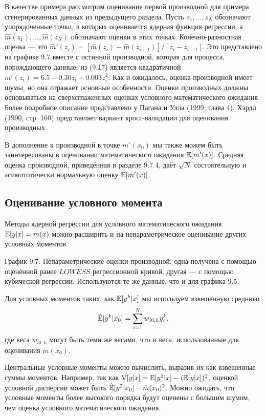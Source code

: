 В качестве примера рассмотрим оценивание первой производной для примера сгенерированных данных из предыдущего раздела. Пусть $z_1, \dots, z_N$ обозначают упорядоченные точки, в которых оценивается ядерная функция регрессии, а $\hat{m}(z_1), \dots, \hat{m}(z_N)$ обозначают оценки в этих точках. Конечно-разностная оценка --- это $\hat{m}'(z_i) = [\hat{m}(z_i) - \hat{m}(z_{i-1})]/[z_i - z_{i-1}]$. Это представлено на графике 9.7 вместе с истинной производной, которая для процесса, порождающего данные,  из (9.17) является квадратичной $m'(z_i) = 6.5 - 0.30z_i + 0.003z_i^2$. Как и ожидалось, оценка производной имеет шумы, но она отражает основные особенности. Оценки производных должны основываться на сверхсглаженных оценках условного математического ожидания. Более подробное описание представлено у Пагана и Улла (1999, глава 4). Хэрдл (1990, стр. 160) представляет вариант кросс-валидации для оценивания производных.

В дополнение к производной в точке $m'(x_0)$ мы также можем быть заинтересованы в оценивании математического ожидания $\mathbb{E}[m'(x)]$. Средняя оценка производной, приведённая в разделе 9.7.4, даёт $\sqrt{N}$ состоятельную и асимптотически нормальную оценку $\mathbb{E}[m'(x)]$.
 
\subsection{Оценивание условного момента}

Методы ядерной регрессии для условного математического ожидания $\mathbb{E}[y|x] = m(x)$ можно расширить и на непараметрическое оценивание других условных моментов.

\vspace{5cm}

График 9.7: Непараметрические оценки производной, одна получена с помощью  оценённой ранее $LOWESS$ регрессионной кривой, другая --- с помощью кубической регрессии. Используются те же данные, что и для графика 9.5.

Для условных моментов таких, как $\mathbb{E}[y^k|x]$ мы используем взвешенную среднюю
\begin{equation}
\hat{\mathbb{E}}[y^k|x_0] = \sum_{i=1}^N w_{i0,h}y_i^k,
\end{equation}
где веса $w_{i0,h}$ могут быть теми же весами, что и веса, использованные для оценивания $m(x_0)$. 

Центральные условные моменты можно вычислить, выразив их как взвешенные суммы моментов. Например, так как $\mathrm{V}[y|x] = \mathbb{E}[y^2|x] - (\mathbb{E}[y|x])^2$, оценкой условной дисперсии может быть $\hat{\mathbb{E}}[y^2|x_0] - \hat{m}(x_0)^2$. Можно ожидать, что условные моменты более высокого порядка будут оценены с большим шумом, чем оценка условного математического ожидания.

